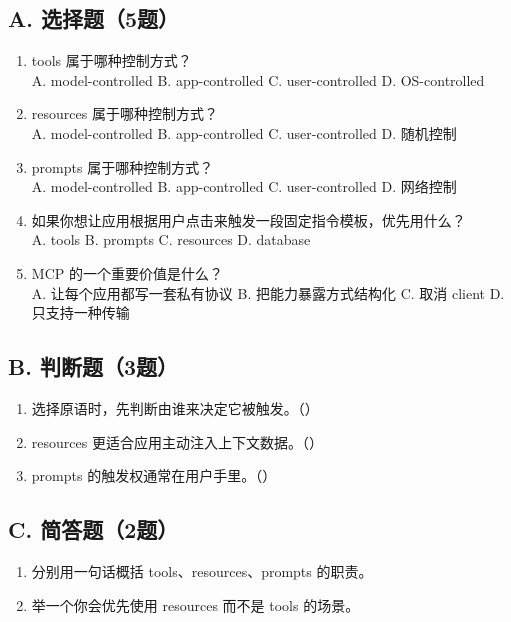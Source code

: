 \documentclass[UTF8,a4paper,11pt]{ctexart}
\begin{document}
\subsection*{A. 选择题（5题）}
\begin{enumerate}
  \item tools 属于哪种控制方式？\\
  A. model-controlled \quad B. app-controlled \quad C. user-controlled \quad D. OS-controlled

  \item resources 属于哪种控制方式？\\
  A. model-controlled \quad B. app-controlled \quad C. user-controlled \quad D. 随机控制

  \item prompts 属于哪种控制方式？\\
  A. model-controlled \quad B. app-controlled \quad C. user-controlled \quad D. 网络控制

  \item 如果你想让应用根据用户点击来触发一段固定指令模板，优先用什么？\\
  A. tools \quad B. prompts \quad C. resources \quad D. database

  \item MCP 的一个重要价值是什么？\\
  A. 让每个应用都写一套私有协议 \quad B. 把能力暴露方式结构化 \quad C. 取消 client \quad D. 只支持一种传输

\end{enumerate}

\subsection*{B. 判断题（3题）}
\begin{enumerate}
  \item 选择原语时，先判断由谁来决定它被触发。（\quad）
  \item resources 更适合应用主动注入上下文数据。（\quad）
  \item prompts 的触发权通常在用户手里。（\quad）
\end{enumerate}

\subsection*{C. 简答题（2题）}
\begin{enumerate}
  \item 分别用一句话概括 tools、resources、prompts 的职责。
  \item 举一个你会优先使用 resources 而不是 tools 的场景。
\end{enumerate}
\end{document}
